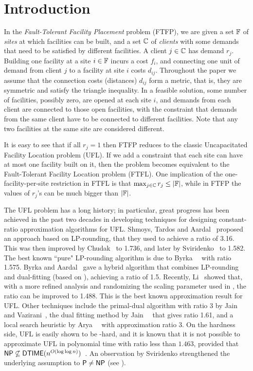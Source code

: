 \section{Introduction}

In the \emph{Fault-Tolerant Facility Placement} problem
(FTFP), we are given a set $\mathbb{F}$ of \emph{sites} at
which facilities can be built, and a set $\mathbb{C}$ of
\emph{clients} with some demands that need to be satisfied
by different facilities. A client $j\in\mathbb{C}$ has demand
$r_j$. Building one facility at a site $i\in\mathbb{F}$ incurs a cost
$f_i$, and connecting one unit of demand from client $j$ to
a facility at site $i$ costs $d_{ij}$. Throughout the
paper we assume that the connection costs (distances)
$d_{ij}$ form a metric, that is, they are
symmetric and satisfy the triangle inequality. In a feasible solution, some
number of facilities, possibly zero, are opened at each site
$i$, and demands from each client are connected to those
open facilities, with the constraint that demands from the
same client have to be connected to different
facilities. Note that any two facilities at the same site are considered different.

It is easy to see that if all $r_j=1$ then FTFP reduces to
the classic Uncapacitated Facility Location problem (UFL).
If we add a constraint that each site can have at most one
facility built on it, then the problem becomes equivalent to the
Fault-Tolerant Facility Location problem (FTFL). One
implication of the one-facility-per-site restriction in FTFL
is that $\max_{j\in\mathbb{C}}r_j \leq |\mathbb{F}|$, while
in FTFP the values of $r_j$'s can be much bigger than
$|\mathbb{F}|$.

The UFL problem has a long history; in particular, great
progress has been achieved in the past two decades in
developing techniques for designing constant-ratio
approximation algorithms for UFL.  Shmoys, Tardos and
Aardal~\cite{ShmoysTA97} proposed an approach based on
LP-rounding, that they used to achieve a ratio of 3.16.
This was then improved by Chudak~\cite{ChudakS04} to 1.736,
and later by Sviridenko~\cite{Svi02} to 1.582.
The best known ``pure" LP-rounding algorithm is due to
Byrka~{\etal}~\cite{ByrkaGS10} with ratio 1.575. 
Byrka and Aardal~\cite{ByrkaA10} gave a hybrid algorithm that combines LP-rounding
and dual-fitting (based on \cite{JainMMSV03}), achieving a ratio of 1.5.  Recently,
Li~\cite{Li11} showed that, with a more refined analysis and
randomizing the scaling parameter used in \cite{ByrkaA10}, the ratio can be improved
to 1.488. This is the best known approximation result for UFL.  
Other techniques include the primal-dual algorithm with ratio 3 by
Jain and Vazirani~\cite{JainV01}, the dual fitting method by
Jain~{\etal}~\cite{JainMMSV03} that gives ratio 1.61, and a
local search heuristic by Arya~{\etal}~\cite{AryaGKMMP04}
with approximation ratio 3.  On the hardness side, UFL is
easily shown to be {\NP}-hard, and it is known that it is
not possible to approximate UFL in polynomial time with
ratio less than $1.463$, provided that
${\mbox{\sf NP}}\not\subseteq{\mbox{\sf DTIME}}(n^{O(\log\log
  n)})$~\cite{GuhaK98}. An observation by Sviridenko
strengthened the underlying assumption to ${\mbox{\sf P}}\ne {\mbox{\sf NP}}$ (see \cite{vygen05}).

